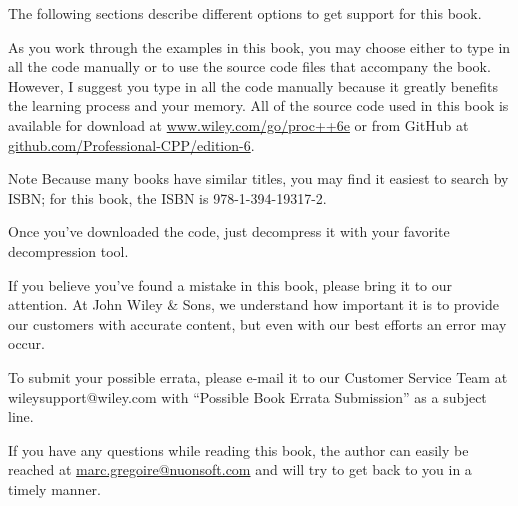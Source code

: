The following sections describe different options to get support for this book.


As you work through the examples in this book, you may choose either to type in all the code manually or to use the source code files that accompany the book. However, I suggest you type in all the code manually because it greatly benefits the learning process and your memory. All of the source code used in this book is available for download at \url{www.wiley.com/go/proc++6e} or from GitHub at \url{github.com/Professional-CPP/edition-6}.

\begin{myNotic}{Note}
Because many books have similar titles, you may find it easiest to search by ISBN; for this book, the ISBN is 978-1-394-19317-2.
\end{myNotic}

Once you’ve downloaded the code, just decompress it with your favorite decompression tool.


If you believe you’ve found a mistake in this book, please bring it to our attention. At John Wiley \& Sons, we understand how important it is to provide our customers with accurate content, but even with our best efforts an error may occur.

To submit your possible errata, please e-mail it to our Customer Service Team at wileysupport@wiley.com with “Possible Book Errata Submission” as a subject line.


If you have any questions while reading this book, the author can easily be reached at \url{marc.gregoire@nuonsoft.com} and will try to get back to you in a timely manner.